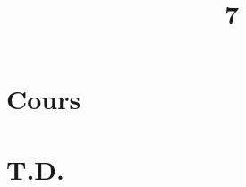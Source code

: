 \documentclass[a4paper]{article}
\title{7}{Probabilités}
\begin{document}
	\part{Cours}
	
	
	
	
	\clearpage\null\clearpage
	\renewcommand{\thesection}{}
	\renewcommand{\thesubsection}{}
	\part{T.D.}
	
\end{document}
